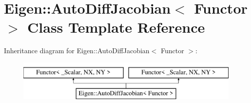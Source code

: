 \hypertarget{class_eigen_1_1_auto_diff_jacobian}{}\section{Eigen\+:\+:Auto\+Diff\+Jacobian$<$ Functor $>$ Class Template Reference}
\label{class_eigen_1_1_auto_diff_jacobian}
Inheritance diagram for Eigen\+:\+:Auto\+Diff\+Jacobian$<$ Functor $>$\+:\begin{figure}[H]
\begin{center}
\leavevmode
\includegraphics[height=2.000000cm]{class_eigen_1_1_auto_diff_jacobian}
\end{center}
\end{figure}
